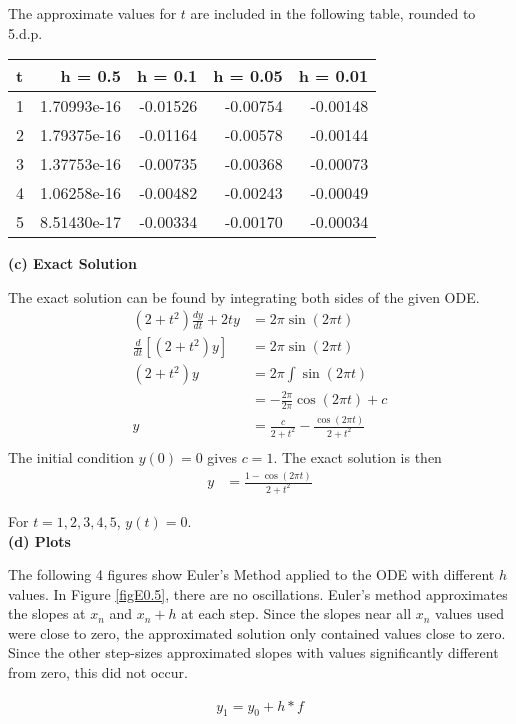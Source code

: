 \documentclass[a4paper,11pt]{article}
\begin{document}
The approximate values for $t$ are included in the following table, rounded to 5.d.p.
\begin{center}
\begin{tabular}{|l|r|r|r|r|}
\hline
t & h = 0.5 & h = 0.1 & h = 0.05 & h = 0.01\\
\hline
1 & 1.70993e-16 & -0.01526 & -0.00754 & -0.00148\\
2 & 1.79375e-16 & -0.01164 & -0.00578 & -0.00144\\
3 & 1.37753e-16 & -0.00735 & -0.00368 & -0.00073\\
4 & 1.06258e-16 & -0.00482 & -0.00243 & -0.00049\\
5 & 8.51430e-17 & -0.00334 & -0.00170 & -0.00034\\
\hline 
\end{tabular}
\end{center}

\textbf{(c) Exact Solution}

The exact solution can be found by integrating both sides of the given ODE.
\begin{align*}
(2 + t^2)\frac{dy}{dt} + 2ty &= 2\pi \sin(2\pi t)\\
\frac{d}{dt}[(2 + t^2)y] &= 2\pi \sin(2\pi t)\\
(2 + t^2)y &= 2\pi \int\sin(2\pi t)\\
&= -\frac{2\pi}{2\pi}\cos(2\pi t) + c\\
y &= \frac{c}{2 + t^2} - \frac{\cos(2\pi t)}{2 + t^2}\\
\end{align*}
The initial condition $y(0) = 0$ gives $c = 1$.
The exact solution is then
\begin{align*}
y &= \frac{1 - \cos(2\pi t)}{2 + t^2}
\end{align*}

For $t = 1,2,3,4,5$, $y(t)=0$.\\

\textbf{(d) Plots}

The following 4 figures show Euler's Method applied to the ODE with different $h$ values.
In Figure \ref{figE0.5}, there are no oscillations. Euler's method approximates the slopes at $x_n$ and $x_n + h$ at each step. Since the slopes near all $x_n$ values used were close to zero, the approximated solution only contained values close to zero. Since the other step-sizes approximated slopes with values significantly different from zero, this did not occur.

\begin{align*}
y_1 = y_0 + h * f
\end{align*}
\end{document}
